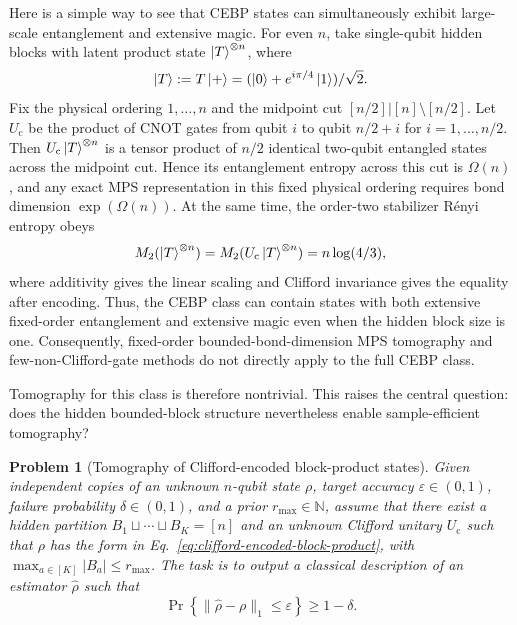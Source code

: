 \documentclass[
  aps,
  prx,
  reprint,
  superscriptaddress,
  amsmath,
  amssymb,
  nofootinbib,
  longbibliography
]{revtex4-2}
\newtheorem*{problem*}{Problem}
\begin{document}
Here is a simple way to see that CEBP states can simultaneously exhibit large-scale entanglement and extensive magic. For even
$n$, take single-qubit hidden blocks with latent product state
$\ket{T}^{\otimes n}$, where
\begin{equation}
\ket{T}:=T\ket{+}=(\ket 0+e^{i\pi/4}\ket 1)/\sqrt2 .
\end{equation}
Fix the physical ordering $1,\ldots,n$ and the midpoint cut
$[n/2]|[n]\setminus[n/2]$.  Let $U_{\mathrm c}$ be the product of CNOT gates
from qubit $i$ to qubit $n/2+i$ for $i=1,\ldots,n/2$.  Then
$U_{\mathrm c}\ket{T}^{\otimes n}$ is a tensor product of $n/2$ identical
two-qubit entangled states across the midpoint cut.  Hence its entanglement
entropy across this cut is $\Omega(n)$, and any exact MPS representation in
this fixed physical ordering requires bond dimension $\exp(\Omega(n))$.
At the same time, the order-two stabilizer R\'enyi entropy
obeys~\cite{LeoneOlivieroHamma2022SRE}
\begin{equation}
M_2(\ket{T}^{\otimes n})
=
M_2(U_{\mathrm c}\ket{T}^{\otimes n})
=
n\log(4/3),
\end{equation}
where additivity gives the linear scaling and Clifford invariance gives the
equality after encoding.  Thus, the CEBP class can contain states with both
extensive fixed-order entanglement and extensive magic even when the hidden
block size is one.  Consequently, fixed-order bounded-bond-dimension MPS
tomography and few-non-Clifford-gate methods do not directly apply to the full
CEBP class.



Tomography for this class is therefore nontrivial.  This
raises the central question: does the hidden bounded-block structure
nevertheless enable sample-efficient tomography?
\begin{problem*}[Tomography of Clifford-encoded block-product states]
\label{prob:cebp-tomography}
Given independent copies of an unknown $n$-qubit state $\rho$, target
accuracy $\varepsilon\in(0,1)$, failure probability
$\delta\in(0,1)$, and a prior $r_{\max}\in\mathbb N$, assume that
there exist a hidden partition $B_1\sqcup\cdots\sqcup B_K=[n]$ and an
unknown Clifford unitary $U_{\mathrm c}$ such that $\rho$ has the form
in Eq.~\eqref{eq:clifford-encoded-block-product}, with
$\max_{a\in[K]} |B_a|\le r_{\max}$. 
The task is to output a classical description of an estimator $\hat\rho$
such that
\begin{equation}
\Pr\!\left\{\|\hat\rho-\rho\|_1\le\varepsilon\right\}
\ge 1-\delta.
\end{equation}
\end{problem*}
\end{document}
